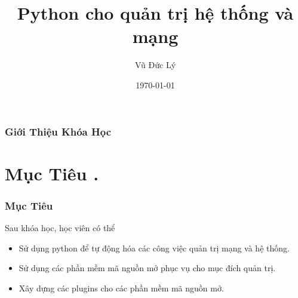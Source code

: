 \documentclass{beamer}
\title[Python cho quản trị hệ thống và mạng]{Python cho quản trị hệ thống và mạng } %
\author{Vũ Đức Lý} %
\date{\today} %
\begin{document}
\begin{frame}
\titlepage %
\hyperlink{intro}{}
\end{frame}

\begin{frame}[label=intro]
\frametitle{Giới Thiệu Khóa Học} %
\tableofcontents %
\end{frame}


\section{Mục Tiêu .} 
\begin{frame}[label=muctieu]
\frametitle{Mục Tiêu}
Sau khóa học, học viên có thể
\begin{itemize}
\item Sử dụng python để tự động hóa các công việc quản trị mạng và hệ thống.
\item Sử dụng các phần mềm mã nguồn mở phục vụ cho mục đích quản trị.
\item Xây dựng các plugins cho các phần mềm mã nguồn mở.
\end{itemize} 


\end{frame}
\end{document}
